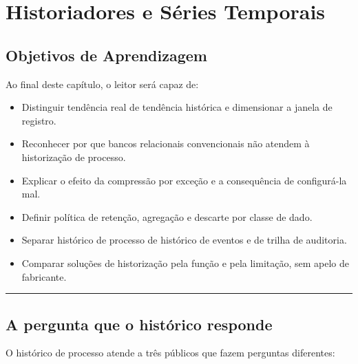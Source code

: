 \chapter{Historiadores e Séries Temporais}\label{historiadores-e-suxe9ries-temporais}

\section*{Objetivos de Aprendizagem}

Ao final deste capítulo, o leitor será capaz de:

\begin{itemize}
\tightlist
\item
  Distinguir tendência real de tendência histórica e dimensionar a janela de registro.
\item
  Reconhecer por que bancos relacionais convencionais não atendem à historização de processo.
\item
  Explicar o efeito da compressão por exceção e a consequência de configurá-la mal.
\item
  Definir política de retenção, agregação e descarte por classe de dado.
\item
  Separar histórico de processo de histórico de eventos e de trilha de auditoria.
\item
  Comparar soluções de historização pela função e pela limitação, sem apelo de fabricante.
\end{itemize}

\begin{center}\rule{0.5\linewidth}{0.5pt}\end{center}

\section{A pergunta que o histórico responde}\label{a-pergunta-que-o-histuxf3rico-responde}

O histórico de processo atende a três públicos que fazem perguntas diferentes:

